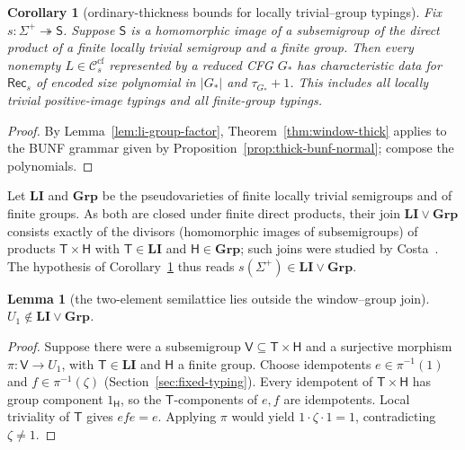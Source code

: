 \documentclass[11pt,a4paper]{article}
\newtheorem{lemma}[theorem]{Lemma}
\newtheorem{corollary}[theorem]{Corollary}
\theoremstyle{remark}
\theoremstyle{plain}
\newcommand{\cf}{\mathrm{cf}}
\newcommand{\Ccf}[1]{\mathcal C_{#1}^{\cf}}
\begin{document}
\begin{corollary}[ordinary-thickness bounds for locally trivial--group typings]
\label{cor:li-thickness}
Fix $s:\Sigma^+\twoheadrightarrow\mathsf S$. Suppose $\mathsf S$ is a homomorphic
image of a subsemigroup of the direct product of a finite locally
trivial semigroup and a finite group.
Then every nonempty $L\in\Ccf{s}$ represented by a reduced CFG $G_*$
has characteristic data for $\mathsf{Rec}_s$ of encoded size
polynomial in $|G_*|$ and $\tau_{G_*}+1$.
This includes all locally trivial positive-image typings and
all finite-group typings.
\end{corollary}
\begin{proof}
By Lemma~\ref{lem:li-group-factor}, Theorem~\ref{thm:window-thick}
applies to the BUNF grammar given by
Proposition~\ref{prop:thick-bunf-normal}; compose the polynomials.

\end{proof}

Let $\mathbf{LI}$ and $\mathbf{Grp}$ be the pseudovarieties of finite locally
trivial semigroups and of finite groups.  As both are closed under finite
direct products, their join $\mathbf{LI}\vee\mathbf{Grp}$ consists exactly of
the divisors (homomorphic images of subsemigroups) of products $\mathsf{T}\times \mathsf{H}$
with $\mathsf{T}\in\mathbf{LI}$ and $\mathsf{H}\in\mathbf{Grp}$; such joins were studied by
Costa~\cite{costa2002li,costa2002lig}.  The hypothesis of
Corollary~\ref{cor:li-thickness} thus reads
$s(\Sigma^+)\in\mathbf{LI}\vee\mathbf{Grp}$.

\begin{lemma}[the two-element semilattice lies outside the window--group join]
\label{lem:U1-outside}
$U_1\notin\mathbf{LI}\vee\mathbf{Grp}$.
\end{lemma}

\begin{proof}
Suppose there were a subsemigroup $\mathsf{V}\subseteq \mathsf{T}\times \mathsf{H}$ and a
surjective morphism $\pi:\mathsf{V}\to U_1$, with
$\mathsf{T}\in\mathbf{LI}$ and $\mathsf{H}$ a finite group.
Choose idempotents $e\in\pi^{-1}(1)$ and $f\in\pi^{-1}(\zeta)$
(Section~\ref{sec:fixed-typing}).
Every idempotent of $\mathsf{T}\times \mathsf{H}$ has group component $1_{\mathsf{H}}$,
so the $\mathsf{T}$-components of $e,f$ are idempotents.
Local triviality of $\mathsf{T}$ gives $efe=e$.
Applying $\pi$ would yield
$1\cdot\zeta\cdot1=1$, contradicting $\zeta\ne1$.
\end{proof}
\end{document}
